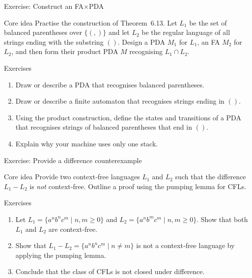 \begin{frame}[t]{Exercise: Construct an FA×PDA}
  \begin{tblock}{Core idea}
    Practise the construction of Theorem 6.13.  Let $L_1$ be the set of
    balanced parentheses over $\{(,)\}$ and let $L_2$ be the regular
    language of all strings ending with the substring $()$.  Design a
    PDA $M_1$ for $L_1$, an FA $M_2$ for $L_2$, and then form their
    product PDA $M$ recognising $L_1 \cap L_2$.
  \end{tblock}
  \begin{tblock}{Exercises}
    \begin{enumerate}
      \item Draw or describe a PDA that recognises balanced parentheses.
      \item Draw or describe a finite automaton that recognises strings
        ending in $()$.
      \item Using the product construction, define the states and
        transitions of a PDA that recognises strings of balanced
        parentheses that end in $()$.
      \item Explain why your machine uses only one stack.
    \end{enumerate}
  \end{tblock}
  \label{fr:6.2-21}
\end{frame}

\begin{frame}[t]{Exercise: Provide a difference counterexample}
  \begin{tblock}{Core idea}
    Provide two context‑free languages $L_1$ and $L_2$ such that the
    difference $L_1 - L_2$ is \emph{not} context‑free.  Outline a proof
    using the pumping lemma for CFLs.
  \end{tblock}
  \begin{tblock}{Exercises}
    \begin{enumerate}
      \item Let $L_1 = \{a^n b^n c^m \mid n,m \ge 0\}$ and $L_2 = \{a^n b^m
        c^m \mid n,m \ge 0\}$.  Show that both $L_1$ and $L_2$ are
        context‑free.
      \item Show that $L_1 - L_2 = \{a^n b^n c^m \mid n \ne m\}$ is not a
        context‑free language by applying the pumping lemma.
      \item Conclude that the class of CFLs is not closed under
        difference.
    \end{enumerate}
  \end{tblock}
  \label{fr:6.2-22}
\end{frame}

